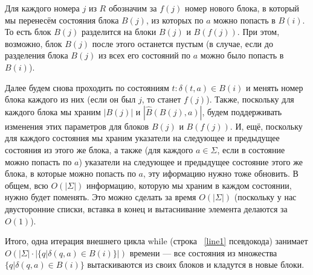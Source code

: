 \documentclass{article}
\begin{document}
Для каждого номера $j$ из $R$ обозначим за $f(j)$ номер нового блока, в который мы перенесём состояния блока $B(j)$, из которых по $a$ можно попасть в $B(i)$. То есть блок $B(j)$ разделится на блоки $B(j)$ и $B(f(j))$. При этом, возможно, блок $B(j)$ после этого останется пустым (в случае, если до разделения блока $B(j)$ из всех его состояний по $a$ можно было попасть в $B(i)$).

Далее будем снова проходить по состояниям $t: \delta(t, a) \in B(i)$ и менять номер блока каждого из них (если он был $j$, то станет $f(j)$). Также, поскольку для каждого блока мы храним $|B(j)|$ и $|\hat B(B(j), a)|$, будем поддерживать изменения этих параметров для блоков $B(j)$ и $B(f(j))$. И, ещё, поскольку для каждого состояния мы храним указатели на следующее и предыдущее состояния из этого же блока, а также (для каждого $a \in \Sigma$, если в состояние можно попасть по $a$) указатели на следующее и предыдущее состояние этого же блока, в которые можно попасть по $a$, эту иформацию нужно тоже обновить. В общем, всю $O(|\Sigma|)$ информацию, которую мы храним в каждом состоянии, нужно будет поменять. Это можно сделать за время $O(|\Sigma|)$ (поскольку у нас двусторонние списки, вставка в конец и вытаснивание элемента делаются за $O(1)$).

Итого, одна итерация внешнего цикла while (строка ~\ref{line1} псевдокода) занимает $O(|\Sigma|\cdot|\{q | \delta(q, a) \in B(i)\}|)$ времени --- все состояния из множества $\{q | \delta(q, a) \in B(i)\}$ вытаскиваются из своих блоков и кладутся в новые блоки.
\end{document}
